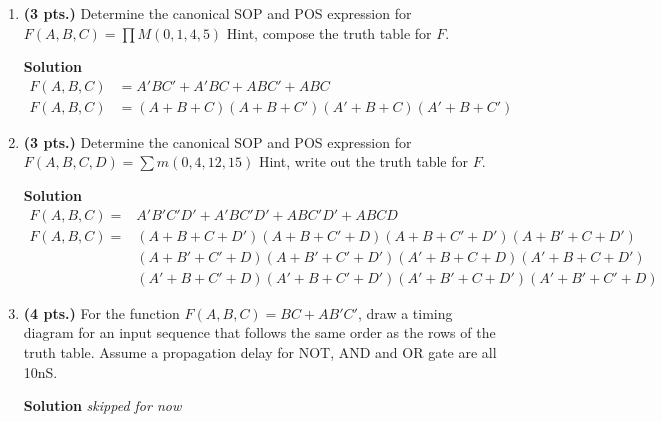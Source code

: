\begin{enumerate}
                    \item \textbf{ (3 pts.)} Determine the canonical SOP and POS expression for
                        $F(A,B,C) = \prod M (0,1,4,5)$  Hint, compose the truth table for $F$.

                        \begin{onlysolution}  \textbf{Solution}
                            \begin{align*}
                                F(A,B,C)&=A'BC' + A'BC +ABC' +ABC  \\
                                F(A,B,C)&=(A+B+C)(A+B+C')(A'+B+C)(A'+B+C')
                            \end{align*}
                        \end{onlysolution}

                    \item \textbf{ (3 pts.)} Determine the canonical SOP and POS expression for
                        $F(A,B,C,D) = \sum m(0,4,12,15)$ Hint, write out the truth table for $F$.

                        \begin{onlysolution}  \textbf{Solution}
                            \begin{align*}
                                F(A,B,C)=&A'B'C'D' + A'BC'D' + ABC'D' + ABCD  \\
                                F(A,B,C)=&(A+B+C+D')(A+B+C'+D)(A+B+C'+D') (A+B'+C+D') \\
                                &(A+B'+C'+D)(A+B'+C'+D')(A'+B+C+D)(A'+B+C+D')\\
                                &(A'+B+C'+D)(A'+B+C'+D')(A'+B'+C+D')(A'+B'+C'+D)
                            \end{align*}
                        \end{onlysolution}

                        \filbreak
                    \item \textbf{ (4 pts.)} For the function $F(A,B,C)= BC+AB'C'$,  draw
                        a timing diagram for an input sequence that follows the same order
                        as the rows of the truth table.  Assume a propagation delay for NOT,
                        AND and OR gate are all 10nS.
                        \begin{onlysolution}  \textbf{Solution} \itshape
                            skipped for now
                        \end{onlysolution}


\end{enumerate}
